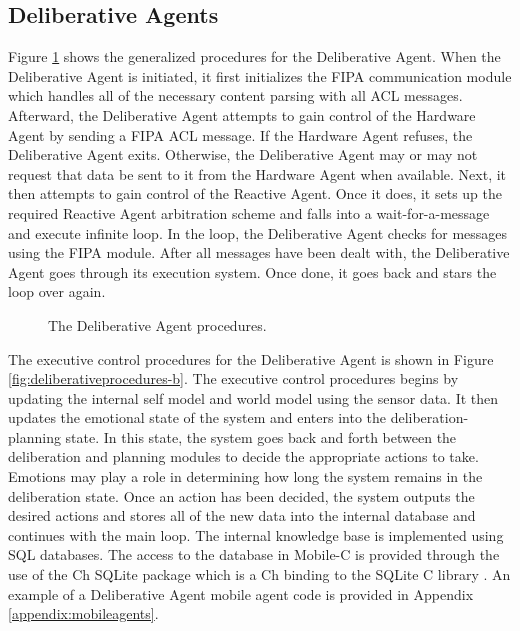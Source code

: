     \subsection{Deliberative Agents}
      Figure \ref{fig:deliberativeprocedures} shows the generalized procedures
        for the Deliberative Agent.
      When the Deliberative Agent is initiated, it first initializes the FIPA
        communication module which handles all of the necessary content
        parsing with all ACL messages.
      Afterward, the Deliberative Agent attempts to gain control of the
        Hardware Agent by sending a FIPA ACL message.
      If the Hardware Agent refuses, the Deliberative Agent exits.
      Otherwise, the Deliberative Agent may or may not request that data be 
        sent to it from the Hardware Agent when available.
      Next, it then attempts to gain control of the Reactive Agent.
      Once it does, it sets up the required Reactive Agent arbitration scheme 
        and falls into a wait-for-a-message and execute infinite loop.
      In the loop, the Deliberative Agent checks for messages using the FIPA
        module.
      After all messages have been dealt with, the Deliberative Agent goes
        through its execution system.
      Once done, it goes back and stars the loop over again.
      \begin{figure}%
      \centerline{
      }
      \caption{The Deliberative Agent procedures.}
      \label{fig:deliberativeprocedures}
      \end{figure}
      The executive control procedures for the Deliberative Agent is shown in
        Figure \ref{fig:deliberativeprocedures-b}.
      The executive control procedures begins by updating the internal self 
        model and world model using the sensor data.
      It then updates the emotional state of the system and enters into the
        deliberation-planning state.
      In this state, the system goes back and forth between the deliberation
        and planning modules to decide the appropriate actions to take.
      Emotions may play a role in determining how long the system remains in
        the deliberation state.
      Once an action has been decided, the system outputs the desired actions
        and stores all of the new data into the internal database and continues
        with the main loop.
      The internal knowledge base is implemented using SQL databases.
      The access to the database in Mobile-C is provided through the use of the
        Ch SQLite package \cite{ChSQLite} which is a Ch binding to the SQLite C
        library \cite{SQLite}.
      An example of a Deliberative Agent mobile agent code is provided in Appendix 
        \ref{appendix:mobileagents}.

